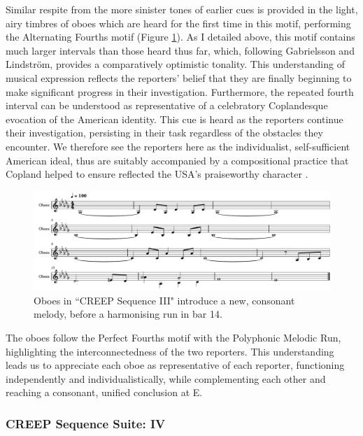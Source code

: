 Similar respite from the more sinister tones of earlier cues is provided in the light, airy timbres of oboes which are heard for the first time in this motif, performing the Alternating Fourths motif (Figure \ref{fig:president-creep-3}).
As I detailed above, this motif contains much larger intervals than those heard thus far, which, following Gabrielsson and Lindström, provides a comparatively optimistic tonality.
This understanding of musical expression reflects the reporters' belief that they are finally beginning to make significant progress in their investigation. 
Furthermore, the repeated fourth interval can be understood as representative of a celebratory Coplandesque evocation of the American identity.
This cue is heard as the reporters continue their investigation, persisting in their task regardless of the obstacles they encounter.
We therefore see the reporters here as the individualist, self-sufficient American ideal, thus are suitably accompanied by a compositional practice that Copland helped to ensure reflected the USA's praiseworthy character .
\begin{figure}
    \centering
    \includegraphics[width=1\linewidth]{img/president-creep-3.pdf}
    \caption{Oboes in ``CREEP Sequence III" introduce a new, consonant melody, before a harmonising run in bar 14.}
    \label{fig:president-creep-3}
\end{figure}
The oboes follow the Perfect Fourths motif with the Polyphonic Melodic Run, highlighting the interconnectedness of the two reporters.
This understanding leads us to appreciate each oboe as representative of each reporter, functioning independently and individualistically, while complementing each other and reaching a consonant, unified conclusion at E\flat.


\subsubsection{CREEP Sequence Suite: IV}

